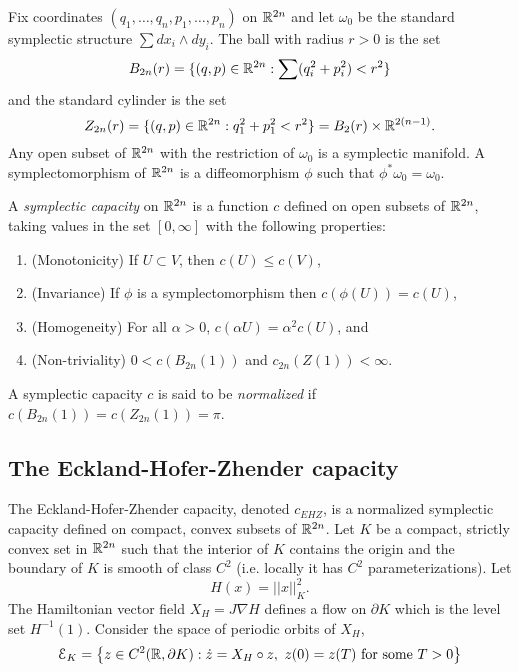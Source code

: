 \documentclass[../capacities_main.tex]{subfiles}
\begin{document}
	
	
	
	Fix coordinates $(q_1, \ldots ,q_n,p_1, \ldots ,p_n)$ on ${\mathbb R}^{2n}$ and let $\omega_0$ be the standard symplectic structure $\sum dx_i\wedge dy_i$.  The ball with radius $r>0$ is the set 
	\begin{equation*}
	B_{2n}(r) = \{ (q,p) \in {\mathbb R}^{2n} : \sum (q_i^2 + p_i^2)< r^2 \}
	\end{equation*}
	and the standard cylinder is the set 
	\begin{equation*}
	Z_{2n}(r) = \{ (q,p) \in {\mathbb R}^{2n} : q_1^2 + p_1^2< r^2 \} = B_2(r) \times {\mathbb R}^{2(n-1)}.
	\end{equation*}
	Any open subset of ${\mathbb R}^{2n}$ with the restriction of $\omega_0$ is a symplectic manifold.  A symplectomorphism of ${\mathbb R}^{2n}$ is a diffeomorphism $\phi$ such that $\phi^*\omega_0 = \omega_0$.
	
	\begin{Definition}
		A \emph{symplectic capacity} on ${\mathbb R}^{2n}$ is a function $c$ defined on open subsets of ${\mathbb R}^{2n}$, taking values in the set $[0,\infty]$ with the following properties:
		\begin{enumerate}
			\item (Monotonicity) If $U \subset V$, then $c(U) \leq c(V)$,
			\item (Invariance) If $\phi$ is a symplectomorphism then $c(\phi(U)) = c(U)$,
			\item (Homogeneity) For all $\alpha >0$, $c(\alpha U) = \alpha^2 c(U)$, and
			\item (Non-triviality) $0 < c(B_{2n}(1))$ and $c_{2n}(Z(1)) < \infty$.
		\end{enumerate}
		A symplectic capacity $c$ is said to be \emph{normalized} if $c(B_{2n}(1)) = c(Z_{2n}(1)) = \pi$.
	\end{Definition}
	
	\subsection{The Eckland-Hofer-Zhender capacity}
	
	The Eckland-Hofer-Zhender capacity, denoted $c_{EHZ}$, is a normalized symplectic capacity defined on compact, convex subsets of ${\mathbb R}^{2n}$. Let $K$ be a compact, strictly convex set in ${\mathbb R}^{2n}$ such that the interior of $K$ contains the origin and the boundary of $K$ is smooth of class $C^2$ (i.e. locally it has $C^2$ parameterizations).  Let
	\begin{equation*}
	H(x) = ||x||_K^2.
	\end{equation*}
	The Hamiltonian vector field $X_H = J\nabla H$ defines a flow on $\partial K$ which is the level set $H^{-1}(1)$.  Consider the space of periodic orbits of $X_H$, 
	\begin{equation*}
	\mathcal{E}_K = \left\{ z \in C^2( {\mathbb R},\partial K) : \dot z = X_H\circ z,\ z(0)=z(T) \text{ for some }T>0\right\}
	\end{equation*}
	
\end{document}
